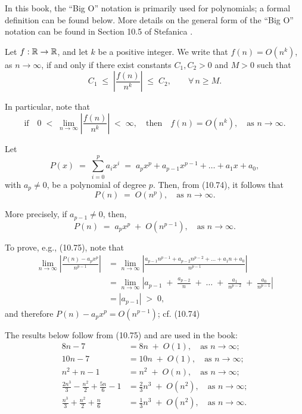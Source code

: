 In this book, the ``Big O'' notation is primarily used for polynomials; a formal
definition can be found below. More details on the general form of the ``Big O''
notation can be found in Section 10.5 of Stefanica \cite{36}.

\begin{definition}
Let $f : \mathbb{R} \to \mathbb{R}$, and let $k$ be a positive integer. We write that
$f(n) = O(n^k)$, as $n \to \infty$, if and only if there exist constants
$C_1,C_2 > 0$ and $M > 0$ such that
\[
C_1 \;\le\; \left|\frac{f(n)}{n^k}\right| \;\le\; C_2, \qquad \forall\, n \ge M.
\]
\end{definition}

In particular, note that
\begin{equation}
\text{if} \quad 0 \;<\; \lim_{n\to\infty}\left|\frac{f(n)}{n^k}\right| \;<\; \infty,
\quad \text{then} \quad f(n) = O(n^k), \quad \text{as } n \to \infty.
\end{equation}

Let
\[
P(x) \;=\; \sum_{i=0}^p a_ix^i \;=\; a_px^p + a_{p-1}x^{p-1} + \ldots + a_1x + a_0,
\]
with $a_p \ne 0$, be a polynomial of degree $p$. Then, from (10.74), it follows that
\[
P(n) \;=\; O(n^p), \quad \text{as } n \to \infty.
\]

More precisely, if $a_{p-1} \ne 0$, then,
\begin{equation}
P(n) \;=\; a_px^p \;+\; O(n^{p-1}), \quad \text{as } n \to \infty.
\end{equation}

To prove, e.g., (10.75), note that
\begin{align*}
\lim_{n\to\infty}\left|\frac{P(n)-a_px^p}{n^{p-1}}\right|
&= \lim_{n\to\infty}\left|\frac{a_{p-1}n^{p-1}+a_{p-2}n^{p-2}+\ldots+a_1n+a_0}
{n^{p-1}}\right| \\
&= \lim_{n\to\infty}\left|a_{p-1} \;+\; \frac{a_{p-2}}{n} \;+\; \ldots \;+\;
\frac{a_1}{n^{p-2}} \;+\; \frac{a_0}{n^{p-1}}\right| \\
&= |a_{p-1}| \;>\; 0,
\end{align*}
and therefore $P(n) - a_px^p = O(n^{p-1})$; cf. (10.74)

The results below follow from (10.75) and are used in the book:
\begin{align}
8n - 7 &= 8n \;+\; O(1), \quad \text{as } n \to \infty; \\
10n - 7 &= 10n \;+\; O(1), \quad \text{as } n \to \infty; \\
n^2 + n - 1 &= n^2 \;+\; O(n), \quad \text{as } n \to \infty; \\
\frac{2n^3}{3} - \frac{n^2}{2} + \frac{5n}{6} - 1 &= \frac{2}{3}n^3 \;+\; O(n^2),
\quad \text{as } n \to \infty; \\
\frac{n^3}{3} + \frac{n^2}{2} + \frac{n}{6} &= \frac{1}{3}n^3 \;+\; O(n^2), \quad
\text{as } n \to \infty.
\end{align}

